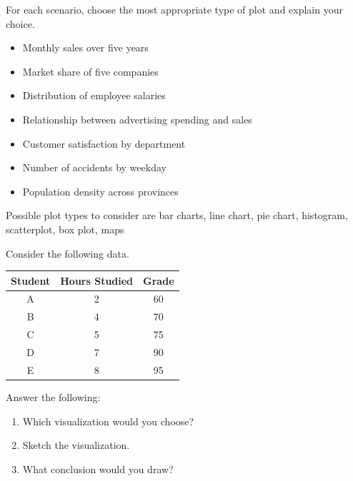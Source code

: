 \begin{exerciseboxpaper}
For each scenario, choose the most appropriate type of plot and explain your choice.

\begin{itemize}
\item Monthly sales over five years
\item Market share of five companies
\item Distribution of employee salaries
\item Relationship between advertising spending and sales
\item Customer satisfaction by department
\item Number of accidents by weekday
\item Population density across provinces
\end{itemize}

Possible plot types to consider are bar charts, line chart, pie chart, histogram, scatterplot, box plot, maps
\end{exerciseboxpaper}


\begin{exerciseboxpaper}
Consider the following data.

\begin{center}
\renewcommand{\arraystretch}{1.25}
\begin{tabular}{ccc}
Student & Hours Studied & Grade\\
\hline
A & 2 & 60\\
B & 4 & 70\\
C & 5 & 75\\
D & 7 & 90\\
E & 8 & 95 \\ \hline
\end{tabular}
\end{center}

Answer the following:

\begin{enumerate}
\item Which visualization would you choose?
\item Sketch the visualization.
\item What conclusion would you draw?
\end{enumerate}
\end{exerciseboxpaper}


